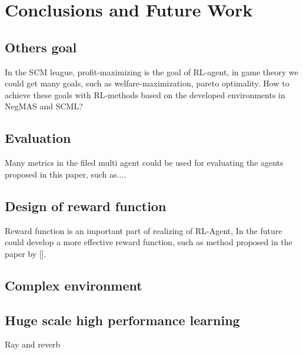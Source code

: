\chapter{Conclusions and Future Work}

\section{Others goal}
In the SCM league, profit-maximizing is the goal of RL-agent, in game theory we could get many goals, such as welfare-maximization, pareto optimality. How to achieve these goals with RL-methods based on the developed environments in NegMAS and SCML?

\section{Evaluation}
Many metrics in the filed multi agent could be used for evaluating the agents proposed in this paper, such as....

\section{Design of reward function}
Reward function is an important part of realizing of RL-Agent, In the future could develop a more effective reward function, such as method proposed in the paper by [].

\section{Complex environment}

\section{Huge scale high performance learning}
Ray and reverb
